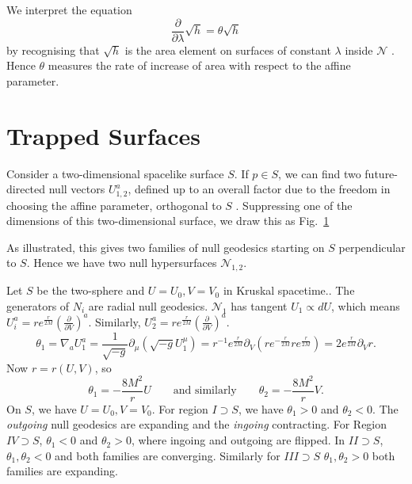 We interpret the equation
\begin{equation}
  \frac{\partial }{\partial \lambda} \sqrt{h} = \theta \sqrt{h}
\end{equation}
by recognising that $\sqrt{h}$  is the area element on surfaces of constant $\lambda$  inside $\mathcal{N}$ . Hence $\theta$  measures the rate of increase of area with respect to the affine parameter.

\section{Trapped Surfaces}%
\label{sec:trapped_surfaces}

Consider a two-dimensional spacelike surface $S$.
If $p \in S$, we can find two future-directed null vectors $U_{1, 2}^a$, defined up to an overall factor due to the freedom in choosing the affine parameter, orthogonal to  $S$ .
Suppressing one of the dimensions of this two-dimensional surface, we draw this as Fig.~\ref{fig:l10f2}
\begin{figure}[tbhp]
  \centering
  \def\svgwidth{0.4\columnwidth}
  
  \caption{}
  \label{fig:l10f2}
\end{figure}
As illustrated, this gives two families of null geodesics starting on $S$ perpendicular to $S$.
Hence we have two null hypersurfaces $\mathcal{N}_{1, 2}$.

\begin{example}[]
  Let $S$ be the two-sphere and $U = U_0, V = V_0$ in Kruskal spacetime..
  The generators of $N_i$ are radial null geodesics.
  $\mathcal{N}_1$ has tangent $U_1 \propto d U$, which means  $U_i^a = r e^{\frac{r}{2M}} \left( \frac{\partial}{\partial V} \right)^a$.
  Similarly, $U_2^a = r e^{\frac{r}{2M}} \left( \frac{\partial }{\partial V} \right)^a$.
  \begin{equation}
    \theta_1 = \nabla_a U_1^a = \frac{1}{\sqrt{-g}} \partial_{\mu} (\sqrt{-g} U_1^{\mu}) = r^{-1}e^{\frac{r}{2M}} \partial_{V} \left( r e^{-\frac{r}{2M}} r e^{\frac{r}{2M}}  \right) = 2 e^{\frac{r}{2M}} \partial_{V} r.
  \end{equation}
  Now $r = r(U, V)$, so  
  \begin{equation}
    \theta_1 = -\frac{8 M^2}{r} U \qquad \text{and similarly} \qquad \theta_2 = -\frac{8 M^2}{r} V.
  \end{equation}
  On $S$, we have $U = U_0, V = V_0$. For region $I \supset S$, we have $\theta_1 > 0$ and $\theta_2 < 0$. The \emph{outgoing} null geodesics are expanding and the \emph{ingoing} contracting.
  For Region $IV \supset S$, $\theta_1 < 0$ and $\theta_2 > 0$, where ingoing and outgoing are flipped.
  In $II \supset S$, $\theta_1 , \theta_2< 0$ and both families are converging.
  Similarly for $III \supset S$ $\theta_1, \theta_2 > 0$ both families are expanding.
\end{example}

